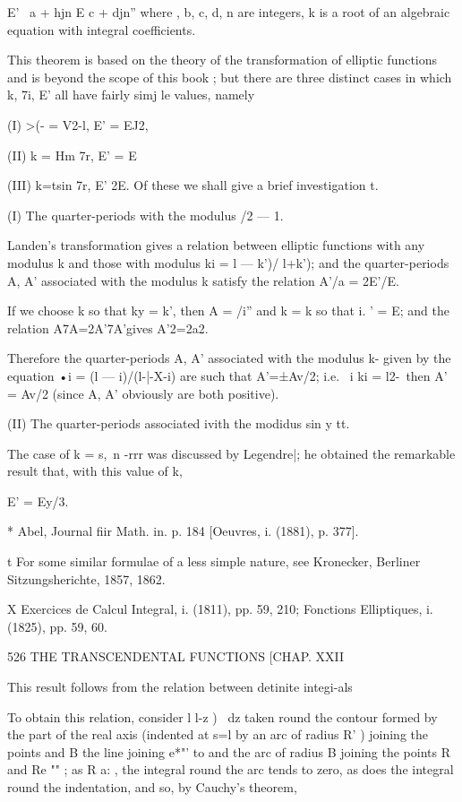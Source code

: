 E' \ a + hjn E c + djn'' where , b, c, d, n are integers, k is a root
of an algebraic equation with integral coefficients.

This theorem is based on the theory of the transformation of elliptic
functions and is beyond the scope of this book ; but there are three
distinct cases in which k, 7i, E' all have fairly simj le values,
namely

(I) >(- = V2-l, E' = EJ2,

(II) k = Hm 7r, E' = E %

(III) k=tsin 7r, E' 2E. Of these we shall give a brief investigation
t.

(I) The quarter-periods with the modulus /2 — 1.

Landen's transformation gives a relation between elliptic functions
with any modulus k and those with modulus ki = l — k')/ l+k'); and the
quarter-periods A, A' associated with the modulus k satisfy the
relation A'/a = 2E'/E.

If we choose k so that ky = k', then A = /i'' and k = k so that i. ' =
E; and the relation A7A=2A'7A'gives A'2=2a2.

Therefore the quarter-periods A, A' associated with the modulus k-
given by the equation •i = (l — i)/(l-|-X-i) are such that A'=±Av/2;
i.e. \ i ki = l2-\, then A' = Av/2 (since A, A' obviously are both
positive).

(II) The quarter-periods associated ivith the modidus sin y tt.

The case of k = s,\ n -rrr was discussed by Legendre|; he obtained the
remarkable result that, with this value of k,

E' = Ey/3.

* Abel, Journal fiir Math. in. p. 184 [Oeuvres, i. (1881), p. 377].

t For some similar formulae of a less simple nature, see Kronecker,
Berliner Sitzungsherichte, 1857, 1862.

X Exercices de Calcul Integral, i. (1811), pp. 59, 210; Fonctions
Elliptiques, i. (1825), pp. 59, 60.

526 THE TRANSCENDENTAL FUNCTIONS [CHAP. XXII

This result follows from the relation between detinite integi-als

To obtain this relation, consider l l-z )~ dz taken round the contour
formed by the part of the real axis (indented at s=l by an arc of
radius R' ) joining the points and B the line joining e*"' to and the
arc of radius B joining the points R and Re "" ; as R a: , the
integral round the arc tends to zero, as does the integral round the
indentation, and so, by Cauchy's theorem,

